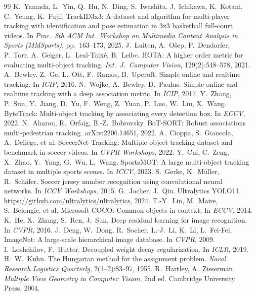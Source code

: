 \documentclass[11pt,a4paper]{article}
\begin{document}
\begin{thebibliography}{99}\small
{} K.~Yamada, L.~Yin, Q.~Hu, N.~Ding, S.~Iwashita, J.~Ichikawa, K.~Kotani, C.~Yeung, K.~Fujii.
TrackID3x3: A dataset and algorithm for multi-player tracking with identification and pose estimation in 3x3
basketball full-court videos. In \emph{Proc.\ 8th ACM Int.\ Workshop on Multimedia Content Analysis in Sports
(MMSports)}, pp.~163--173, 2025.
 J.~Luiten, A.~O\v{s}ep, P.~Dendorfer, P.~Torr, A.~Geiger, L.~Leal-Taix\'e, B.~Leibe.
HOTA: A higher order metric for evaluating multi-object tracking. \emph{Int.\ J.\ Computer Vision}, 129(2):548--578, 2021.
 A.~Bewley, Z.~Ge, L.~Ott, F.~Ramos, B.~Upcroft. Simple online and realtime tracking. In \emph{ICIP}, 2016.
 N.~Wojke, A.~Bewley, D.~Paulus. Simple online and realtime tracking with a deep association metric. In \emph{ICIP}, 2017.
 Y.~Zhang, P.~Sun, Y.~Jiang, D.~Yu, F.~Weng, Z.~Yuan, P.~Luo, W.~Liu, X.~Wang.
ByteTrack: Multi-object tracking by associating every detection box. In \emph{ECCV}, 2022.
 N.~Aharon, R.~Orfaig, B.-Z.~Bobrovsky. BoT-SORT: Robust associations multi-pedestrian tracking.
arXiv:2206.14651, 2022.
 A.~Cioppa, S.~Giancola, A.~Deli\`ege, et al. SoccerNet-Tracking: Multiple object tracking dataset and
benchmark in soccer videos. In \emph{CVPR Workshops}, 2022.
 Y.~Cui, C.~Zeng, X.~Zhao, Y.~Yang, G.~Wu, L.~Wang. SportsMOT: A large multi-object tracking dataset in
multiple sports scenes. In \emph{ICCV}, 2023.
 S.~Gerke, K.~M\"uller, R.~Sch\"afer. Soccer jersey number recognition using convolutional neural networks.
In \emph{ICCV Workshops}, 2015.
 G.~Jocher, J.~Qiu. Ultralytics YOLO11. \url{https://github.com/ultralytics/ultralytics}, 2024.
 T.-Y.~Lin, M.~Maire, S.~Belongie, et al. Microsoft COCO: Common objects in context. In \emph{ECCV}, 2014.
 K.~He, X.~Zhang, S.~Ren, J.~Sun. Deep residual learning for image recognition. In \emph{CVPR}, 2016.
 J.~Deng, W.~Dong, R.~Socher, L.-J.~Li, K.~Li, L.~Fei-Fei. ImageNet: A large-scale hierarchical image
database. In \emph{CVPR}, 2009.
 I.~Loshchilov, F.~Hutter. Decoupled weight decay regularization. In \emph{ICLR}, 2019.
 H.~W.~Kuhn. The Hungarian method for the assignment problem. \emph{Naval Research Logistics Quarterly},
2(1--2):83--97, 1955.
 R.~Hartley, A.~Zisserman. \emph{Multiple View Geometry in Computer Vision}, 2nd ed. Cambridge
University Press, 2004.
\end{thebibliography}
\end{document}

